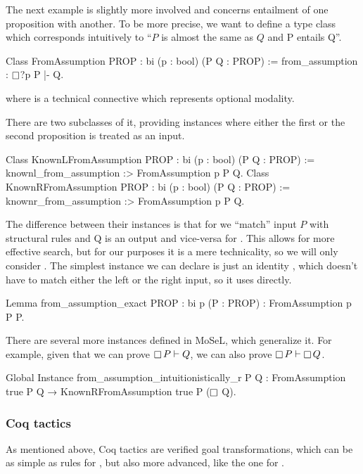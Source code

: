 The next example is slightly more involved and concerns entailment of one proposition with another.
To be more precise, we want to define a type class which corresponds intuitively to ``\(P\) is almost the same as \(Q\) and P entails Q''.
\begin{coq}
Class FromAssumption {PROP : bi} (p : bool) (P Q : PROP) :=
  from_assumption : $\mathop{\Box}$?p P |- Q.
\end{coq}
where  is a technical connective which represents optional modality.

There are two subclasses of it, providing instances where either the first or the second proposition is treated as an input.
\begin{coq}
Class KnownLFromAssumption {PROP : bi} (p : bool) (P Q : PROP) :=
  knownl_from_assumption :> FromAssumption p P Q.
Class KnownRFromAssumption {PROP : bi} (p : bool) (P Q : PROP) :=
  knownr_from_assumption :> FromAssumption p P Q.
\end{coq}

The difference between their instances is that for  we ``match'' input \(P\) with structural rules and Q is an output and vice-versa for .
This allows for more effective search, but for our purposes it is a mere technicality, so we will only consider .
The simplest instance we can declare is just an identity , which doesn't have to match either the left or the right input, so it uses  directly.

\begin{coq}
Lemma from_assumption_exact {PROP : bi} p (P : PROP) : FromAssumption p P P.
\end{coq}

There are several more instances defined in MoSeL, which generalize it.
For example, given that we can prove \(\mathop{\Box} P \vdash Q\), we can also prove  \(\mathop{\Box} P \vdash \mathop{\Box} Q\).
\begin{coq}
Global Instance from_assumption_intuitionistically_r P Q :
  FromAssumption true P Q → KnownRFromAssumption true P ($\mathop{\Box}$ Q).
\end{coq}

\subsubsection{Coq tactics}
\label{sec:coq-tactics}

As mentioned above, Coq tactics are verified goal transformations, which can be as simple as rules for , but also more advanced, like the one for .

